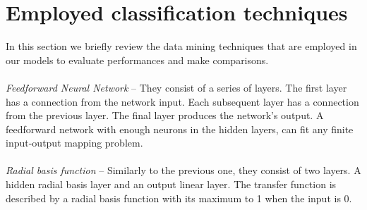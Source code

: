 \documentclass[twocolumn,11pt]{asme2ej}
\begin{document}


\section{Employed classification techniques}

In this section we briefly review the data mining
techniques that are employed in our models to evaluate performances and make comparisons.
\\\\
\textit{Feedforward Neural Network} -- They consist of a series of layers. The first layer has a connection from the network input. Each subsequent layer has a connection from the previous layer. The final layer produces the network's output. A feedforward network with enough neurons in the hidden layers, can fit any finite input-output mapping problem. 
\\\\
\textit{Radial basis function} -- Similarly to the previous one, they consist of two layers. A hidden radial basis layer and an output linear layer. The transfer function is described by a radial basis function with its maximum to 1 when the input is 0. %
\end{document}
